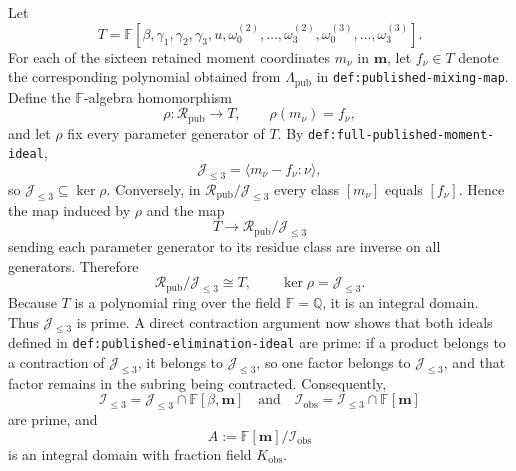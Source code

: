 Let
\[
T=\mathbb F[\beta,\gamma_1,\gamma_2,\gamma_3,u,
\omega^{(2)}_0,\ldots,\omega^{(2)}_3,
\omega^{(3)}_0,\ldots,\omega^{(3)}_3].
\]
For each of the sixteen retained moment coordinates \(m_\nu\) in \(\mathbf m\), let \(f_\nu\in T\) denote the corresponding polynomial obtained from \(\Lambda_{\mathrm{pub}}\) in \texttt{def:published-mixing-map}.  Define the \(\mathbb F\)-algebra homomorphism
\[
\rho:\mathcal R_{\mathrm{pub}}\longrightarrow T,
\qquad
\rho(m_\nu)=f_\nu,
\]
and let \(\rho\) fix every parameter generator of \(T\).  By \texttt{def:full-published-moment-ideal},
\[
\mathcal J_{\leq3}=\langle m_\nu-f_\nu:\nu\rangle,
\]
so \(\mathcal J_{\leq3}\subseteq\ker\rho\).  Conversely, in \(\mathcal R_{\mathrm{pub}}/\mathcal J_{\leq3}\) every class \([m_\nu]\) equals \([f_\nu]\).  Hence the map induced by \(\rho\) and the map
\[
T\longrightarrow\mathcal R_{\mathrm{pub}}/\mathcal J_{\leq3}
\]
sending each parameter generator to its residue class are inverse on all generators.  Therefore
\[
\mathcal R_{\mathrm{pub}}/\mathcal J_{\leq3}\cong T,
\qquad
\ker\rho=\mathcal J_{\leq3}.
\]
Because \(T\) is a polynomial ring over the field \(\mathbb F=\mathbb Q\), it is an integral domain.  Thus \(\mathcal J_{\leq3}\) is prime.  A direct contraction argument now shows that both ideals defined in \texttt{def:published-elimination-ideal} are prime: if a product belongs to a contraction of \(\mathcal J_{\leq3}\), it belongs to \(\mathcal J_{\leq3}\), so one factor belongs to \(\mathcal J_{\leq3}\), and that factor remains in the subring being contracted.  Consequently,
\[
\mathcal I_{\leq3}=\mathcal J_{\leq3}\cap\mathbb F[\beta,\mathbf m]
\quad\text{and}\quad
\mathcal I_{\mathrm{obs}}=\mathcal I_{\leq3}\cap\mathbb F[\mathbf m]
\]
are prime, and
\[
A:=\mathbb F[\mathbf m]/\mathcal I_{\mathrm{obs}}
\]
is an integral domain with fraction field \(K_{\mathrm{obs}}\).

